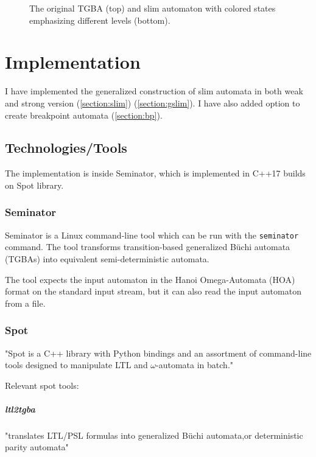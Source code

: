 \documentclass[
	digital,
nolof, nolot
]{fithesis3}
\begin{document}
						
			\begin{figure}[ht]
				\begin{center}
					
					
				\end{center}
				\caption{The original TGBA (top) and slim automaton with colored states emphasizing different levels (bottom).  }
				\label{fig:slim:gg}
			\end{figure}
			

			
	\chapter{Implementation} \label{implementation}
		I have implemented the generalized construction of slim automata in both weak and strong version  (\ref{section:slim}) (\ref{section:gslim}). I have also added option to create breakpoint automata (\ref{section:bp}).
		
		\section{Technologies/Tools}
		The implementation is inside Seminator, which is implemented in C++17 builds on Spot library. %
		\subsection{Seminator} 
		Seminator is a Linux command-line tool which can be run with the \texttt{seminator} command. The tool transforms transition-based generalized Büchi automata (TGBAs) into equivalent semi-deterministic automata. \cite{Klokočka2017thesis}\cite{seminator}\cite{seminator2}
		
		
		
		The tool expects the input automaton in the Hanoi Omega-Automata (HOA) format \cite{DBLP:conf/cav/BabiakBDKKM0S15} on the standard input stream, but it can also read the input automaton from a file.
		
	\subsection{Spot}
	"Spot is a C++ library with Python bindings and an assortment of command-line tools designed to manipulate LTL and $\omega$-automata in batch." \cite[Abstract]{spot2}
	
	Relevant spot tools:
	\paragraph{ltl2tgba} "translates LTL/PSL formulas into generalized Büchi automata,or deterministic parity automata" \cite{spot}
\end{document}
